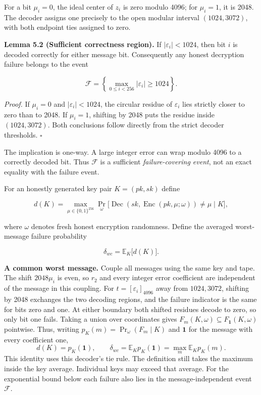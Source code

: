 \documentclass[
  11pt,
  a4paper,
  oneside]{report}
\begin{document}
For a bit \(\mu_i=0\), the ideal center of \(z_i\) is zero modulo 4096;
for \(\mu_i=1\), it is 2048. The decoder assigns one precisely to the
open modular interval \((1024,3072)\), with both endpoint ties assigned
to zero.

\textbf{Lemma 5.2 (Sufficient correctness region).} If
\(|\varepsilon_i|<1024\), then bit \(i\) is decoded correctly for either
message bit. Consequently any honest decryption failure belongs to the
event

\[
\mathcal F=\left\{\max_{0\le i<256}|\varepsilon_i|\ge1024\right\}.
\]

\emph{Proof.} If \(\mu_i=0\) and \(|\varepsilon_i|<1024\), the circular
residue of \(\varepsilon_i\) lies strictly closer to zero than to 2048.
If \(\mu_i=1\), shifting by 2048 puts the residue inside
\((1024,3072)\). Both conclusions follow directly from the strict
decoder thresholds. \(\square\)

The implication is one-way. A large integer error can wrap modulo 4096
to a correctly decoded bit. Thus \(\mathcal F\) is a sufficient
\emph{failure-covering event}, not an exact equality with the failure
event.

For an honestly generated key pair \(K=(pk,sk)\) define

\[
d(K)=\max_{\mu\in\{0,1\}^{256}}
\Pr_{\omega}\bigl[
\operatorname{Dec}(sk,\operatorname{Enc}(pk,\mu;\omega))\ne\mu
\mid K\bigr],
\]

where \(\omega\) denotes fresh honest encryption randomness. Define the
averaged worst-message failure probability

\[
\boxed{\quad \delta_{wc}=\mathbb E_{K}\bigl[d(K)\bigr].\quad}
\]

\textbf{A common worst message.} Couple all messages using the same key
and tape. The shift \(2048\mu_i\) is even, so \(r_2\) and every integer
error coefficient are independent of the message in this coupling. For
\(t=[\varepsilon_i]_{4096}\) away from \(1024,3072\), shifting by 2048
exchanges the two decoding regions, and the failure indicator is the
same for bits zero and one. At either boundary both shifted residues
decode to zero, so only bit one fails. Taking a union over coordinates
gives \(F_m(K,\omega)\subseteq F_{\mathbf1}(K,\omega)\) pointwise. Thus,
writing \(p_K(m)=\Pr_\omega(F_m\mid K)\) and \(\mathbf1\) for the
message with every coefficient one, \[
d(K)=p_K(\mathbf1),\qquad
\delta_{wc}=\mathbb E_K p_K(\mathbf1)=\max_m\mathbb E_K p_K(m).
\] This identity uses this decoder's tie rule. The definition still
takes the maximum inside the key average. Individual keys may exceed
that average. For the exponential bound below each failure also lies in
the message-independent event \(\mathcal F\).
\end{document}
